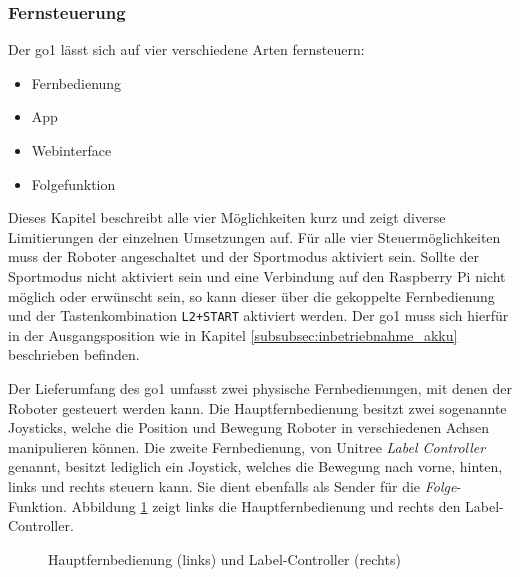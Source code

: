 \subsubsection{Fernsteuerung}
\label{subsubsec:fernsteuerung}

Der \gls{go1} lässt sich auf vier verschiedene Arten fernsteuern:

\begin{itemize}
    \item Fernbedienung
    \item App
    \item Webinterface
    \item Folgefunktion
\end{itemize}

\noindent Dieses Kapitel beschreibt alle vier Möglichkeiten kurz und zeigt diverse Limitierungen der einzelnen Umsetzungen auf.
Für alle vier Steuermöglichkeiten muss der Roboter angeschaltet und der Sportmodus aktiviert sein.
Sollte der Sportmodus nicht aktiviert sein und eine Verbindung auf den Raspberry Pi nicht möglich oder erwünscht sein,
so kann dieser über die gekoppelte Fernbedienung und der Tastenkombination \texttt{L2+START} aktiviert werden.
Der \gls{go1} muss sich hierfür in der Ausgangsposition wie in Kapitel \ref{subsubsec:inbetriebnahme_akku} beschrieben befinden.


Der Lieferumfang des \gls{go1} umfasst zwei physische Fernbedienungen, mit denen der Roboter gesteuert werden kann.
Die Hauptfernbedienung besitzt zwei sogenannte Joysticks, welche die Position und Bewegung Roboter in verschiedenen Achsen
manipulieren können.
Die zweite Fernbedienung, von Unitree \emph{Label Controller} genannt, besitzt lediglich ein Joystick, welches die Bewegung
nach vorne, hinten, links und rechts steuern kann.
Sie dient ebenfalls als Sender für die \emph{Folge}-Funktion.
Abbildung \ref{fig:controller} zeigt links die Hauptfernbedienung und rechts den Label-Controller.

\begin{figure}[h]
    \caption{Hauptfernbedienung (links) und Label-Controller (rechts)}\label{fig:controller}
\end{figure}

